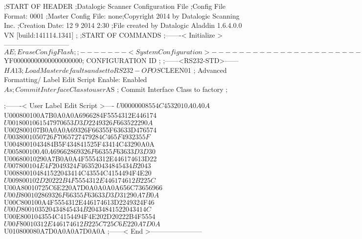;START OF HEADER
;Datalogic Scanner Configuration File
;Config File Format: 0001
;Master Config File: none;Copyright 2014 by Datalogic Scanning Inc.
;Creation Date: 12 9 2014 2:30
;File created by Datalogic Aladdin 1.6.4.0.0 VN [build:141114.1341]
;
;START OF COMMANDS
;-------< Initialize >-----------------------------
$AE                 ; Erase Config Flash
;
;-------< System Configuration >-------------------------------
$YF00000000000000000000; CONFIGURATION ID
;
;------<RS232-STD>------
$HA13               ; Load Master defaults and set to RS232-OPOS
$CLEEN01            ; Advanced Formatting/ Label Edit Script Enable: Enabled
$As                 ; Commit Interface Class to user
$AS                 ; Commit Interface Class to factory
;

;-------< User Label Edit Script >----
$U00000008554C4532010A0A0A
$U000800100A7B0A0A0A6966284F5554312E446174
$U0018001061547970653D3D2249326F663522290A
$U002800107B0A0A0A69326F66355F63633D476574
$U0038001050726F7065727479284C465F4932355F
$U0048001043484B5F434841525F43414C43290A0A
$U005800100A0A69662869326F66355F63633D3D30
$U00680010290A7B0A0A4F5554312E446174613D22
$U007800104E4F2049324F463520434845434B2043
$U008800104841522043414C43554C4154494F4E20
$U009800102D20222B4F5554312E446174612B225C
$U00A80010725C6E220A7D0A0A0A0A656C73656966
$U00B800102869326F66355F63633D3D31290A7B0A
$U00C800100A4F5554312E446174613D2249324F46
$U00D800103520434845434B20434841522043414C
$U00E8001043554C4154494F4E202D20222B4F5554
$U00F80010312E446174612B225C725C6E220A7D0A
$U010800080A7D0A0A0A7D0A0A
;------< End >-----------------------
